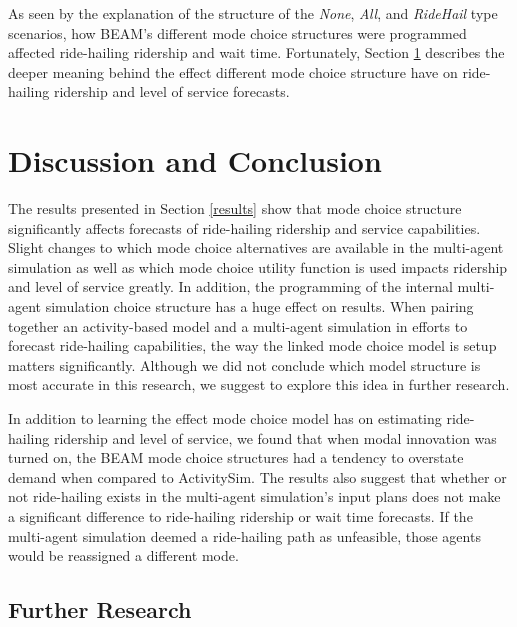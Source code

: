 \documentclass[simple, masters, twoside]{byuthesis}
\begin{document}
As seen by the explanation of the structure of the \emph{None}, \emph{All}, and \emph{RideHail} type scenarios, how BEAM's different mode choice structures were programmed affected ride-hailing ridership and wait time. Fortunately, Section \ref{discussion} describes the deeper meaning behind the effect different mode choice structure have on ride-hailing ridership and level of service forecasts.

\hypertarget{discussion}{%
\chapter{Discussion and Conclusion}\label{discussion}}

The results presented in Section \ref{results} show that mode choice structure significantly affects forecasts of ride-hailing ridership and service capabilities. Slight changes to which mode choice alternatives are available in the multi-agent simulation as well as which mode choice utility function is used impacts ridership and level of service greatly. In addition, the programming of the internal multi-agent simulation choice structure has a huge effect on results. When pairing together an activity-based model and a multi-agent simulation in efforts to forecast ride-hailing capabilities, the way the linked mode choice model is setup matters significantly. Although we did not conclude which model structure is most accurate in this research, we suggest to explore this idea in further research.

In addition to learning the effect mode choice model has on estimating ride-hailing ridership and level of service, we found that when modal innovation was turned on, the BEAM mode choice structures had a tendency to overstate demand when compared to ActivitySim. The results also suggest that whether or not ride-hailing exists in the multi-agent simulation's input plans does not make a significant difference to ride-hailing ridership or wait time forecasts. If the multi-agent simulation deemed a ride-hailing path as unfeasible, those agents would be reassigned a different mode.

\hypertarget{further-research}{%
\section{Further Research}\label{further-research}}
\end{document}
